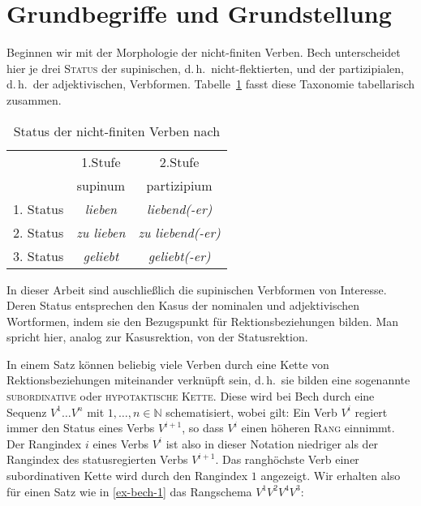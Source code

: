\section{Grundbegriffe und Grundstellung} \label{sec-kohaerenz-einf}

Beginnen wir mit der Morphologie der nicht-finiten Verben. Bech unterscheidet hier je drei \textsc{Status} der supinischen, d.\,h.\ nicht-flektierten, und der partizipialen, d.\,h.\ der adjektivischen, Verb\-for\-men. Tabelle~\ref{fig-status} fasst diese Taxonomie tabellarisch zusammen.   
\begin{table}[t]
\begin{center}

\begin{tabular}{c|cc}
& 1.Stufe	& 2.Stufe 	\\
& supinum	& partizipium	\\
\hline
1. Status	& \emph{lieben}	& \emph{liebend(-er)}\\
2. Status	& \emph{zu lieben} & \emph{zu liebend(-er)}\\
3. Status	& \emph{geliebt}& \emph{geliebt(-er)}
\end{tabular}

\end{center}
\caption{Status der nicht-finiten Verben nach \cite{Bech:55} \label{fig-status}}
\end{table}
In dieser Arbeit sind auschlie\ss lich die supinischen Verb\-formen von Interesse. Deren Status entsprechen den Kasus der nominalen und adjektivischen Wortformen, indem sie den Bezugspunkt für Rektionsbeziehungen bilden. Man spricht hier, analog zur Kasusrektion, von der Statusrektion. 

In einem Satz können beliebig viele Verben durch eine Kette von Rektionsbeziehungen miteinander verknüpft sein, d.\,h.\ sie bilden eine sogenannte \textsc{subordinative} oder \textsc{hypotaktische Kette}. Diese wird bei Bech durch eine Sequenz $V^{1} \ldots V^{n}$ mit $1, \ldots , n \in \mathbb{N}$ schematisiert, wobei gilt: Ein Verb $V^i$ regiert immer den Status eines Verbs $V^{i+1}$, so dass $V^i$ einen höheren \textsc{Rang} einnimmt. Der Rangindex $i$ eines Verbs $V^i$ ist also in dieser Notation niedriger als der Rangindex des statusregierten Verbs $V^{i+1}$. Das ranghöchste Verb einer subordinativen Kette wird durch den Rangindex $1$ angezeigt. Wir erhalten also für einen Satz wie in \ref{ex-bech-1} das Rangschema $V^1 V^2 V^4 V^3$:

